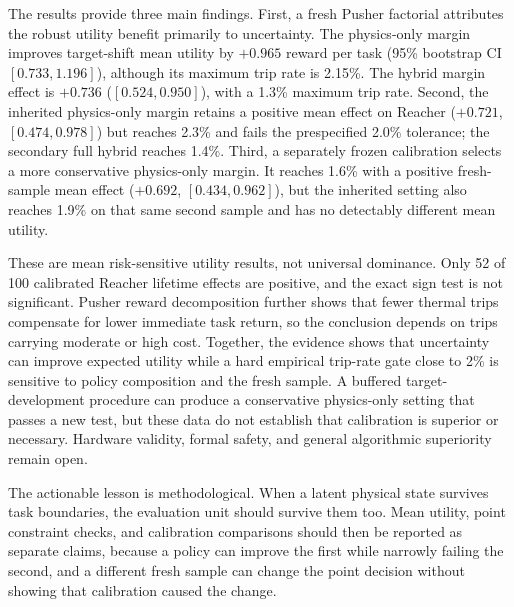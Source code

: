 The results provide three main findings. First, a fresh Pusher factorial
attributes the robust utility benefit primarily to uncertainty. The
physics-only margin improves target-shift mean utility by $+0.965$ reward per
task (95\% bootstrap CI $[0.733,1.196]$), although its maximum trip rate is
2.15\%. The hybrid margin effect is $+0.736$ ($[0.524,0.950]$), with a 1.3\%
maximum trip rate. Second, the inherited physics-only margin retains a positive
mean effect on Reacher ($+0.721$, $[0.474,0.978]$) but reaches 2.3\% and fails
the prespecified 2.0\% tolerance; the secondary full hybrid reaches 1.4\%.
Third, a separately frozen calibration selects a more conservative
physics-only margin. It reaches 1.6\% with a positive fresh-sample mean effect
($+0.692$, $[0.434,0.962]$), but the inherited setting also reaches 1.9\% on
that same second sample and has no detectably different mean utility.

These are mean risk-sensitive utility results, not universal dominance. Only
52 of 100 calibrated Reacher lifetime effects are positive, and the exact sign
test is not significant. Pusher reward decomposition further shows that fewer
thermal trips compensate for lower immediate task return, so the conclusion
depends on trips carrying moderate or high cost. Together, the evidence shows
that uncertainty can improve expected utility while a hard empirical trip-rate
gate close to 2\% is sensitive to policy composition and the fresh sample. A
buffered target-development procedure can produce a conservative physics-only
setting that passes a new test, but these data do not establish that calibration
is superior or necessary. Hardware validity, formal safety, and general
algorithmic superiority remain open.

The actionable lesson is methodological. When a latent physical state survives
task boundaries, the evaluation unit should survive them too. Mean utility,
point constraint checks, and calibration comparisons should then be reported as
separate claims, because a policy can improve the first while narrowly failing
the second, and a different fresh sample can change the point decision without
showing that calibration caused the change.
